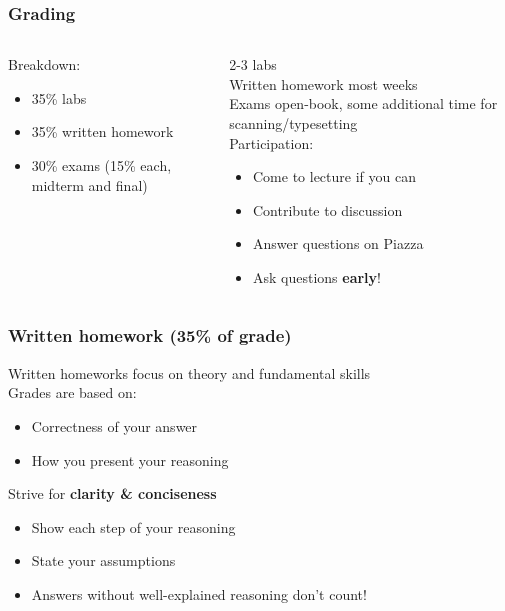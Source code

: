 \documentclass[10pt]{beamer}
\begin{document}
\begin{frame}

\frametitle{Grading}

\begin{columns}
\begin{column}{0.45\textwidth}
Breakdown:
\begin{itemize}
\item 35\% labs
\item 35\% written homework
\item 30\% exams (15\% each, midterm and final)
\end{itemize}
\end{column}

\begin{column}{0.55\textwidth}
2-3 labs
\\[1em]

Written homework most weeks
\\[1em]

Exams open-book, some additional time for scanning/typesetting
\\[1em]

Participation:
\begin{itemize}
\item Come to lecture if you can
\item Contribute to discussion
\item Answer questions on Piazza
\item Ask questions \textbf{early}!
\end{itemize}
\end{column}
\end{columns}

\end{frame}


\begin{frame}

\frametitle{Written homework (35\% of grade)}

Written homeworks focus on theory and fundamental skills
\\[1em]

Grades are based on:
\begin{itemize}
\item Correctness of your answer
\item How you present your reasoning\\[1em]
\end{itemize}

Strive for \textbf{clarity \& conciseness}
\begin{itemize}
\item Show each step of your reasoning
\item State your assumptions
\item Answers without well-explained reasoning don't count!
\end{itemize}

\end{frame}
\end{document}
